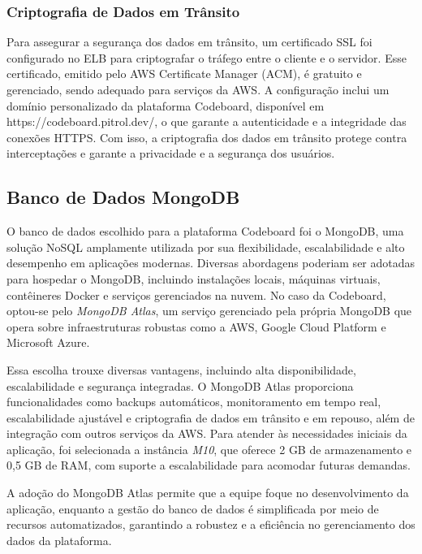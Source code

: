 \subsubsection{Criptografia de Dados em Trânsito}

Para assegurar a segurança dos dados em trânsito, um certificado SSL foi configurado no ELB para criptografar o tráfego entre o cliente e o servidor. Esse certificado, emitido pelo AWS Certificate Manager (ACM), é gratuito e gerenciado, sendo adequado para serviços da AWS. A configuração inclui um domínio personalizado da plataforma Codeboard, disponível em https://codeboard.pitrol.dev/, o que garante a autenticidade e a integridade das conexões HTTPS. Com isso, a criptografia dos dados em trânsito protege contra interceptações e garante a privacidade e a segurança dos usuários.


\subsection{Banco de Dados MongoDB}

O banco de dados escolhido para a plataforma Codeboard foi o MongoDB, uma solução NoSQL amplamente utilizada por sua flexibilidade, escalabilidade e alto desempenho em aplicações modernas. Diversas abordagens poderiam ser adotadas para hospedar o MongoDB, incluindo instalações locais, máquinas virtuais, contêineres Docker e serviços gerenciados na nuvem. No caso da Codeboard, optou-se pelo \emph{MongoDB Atlas}, um serviço gerenciado pela própria MongoDB que opera sobre infraestruturas robustas como a AWS, Google Cloud Platform e Microsoft Azure.

Essa escolha trouxe diversas vantagens, incluindo alta disponibilidade, escalabilidade e segurança integradas. O MongoDB Atlas proporciona funcionalidades como backups automáticos, monitoramento em tempo real, escalabilidade ajustável e criptografia de dados em trânsito e em repouso, além de integração com outros serviços da AWS. Para atender às necessidades iniciais da aplicação, foi selecionada a instância \emph{M10}, que oferece 2 GB de armazenamento e 0,5 GB de RAM, com suporte a escalabilidade para acomodar futuras demandas.

A adoção do MongoDB Atlas permite que a equipe foque no desenvolvimento da aplicação, enquanto a gestão do banco de dados é simplificada por meio de recursos automatizados, garantindo a robustez e a eficiência no gerenciamento dos dados da plataforma.


